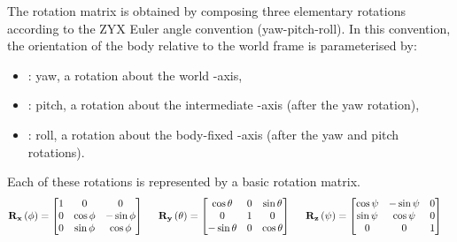 The rotation matrix  is obtained by composing three elementary rotations according to
the ZYX Euler angle convention (yaw-pitch-roll). In this convention, the orientation of the body
relative to the world frame is parameterised by:
\begin{itemize}
	\item \scal{\psi}: yaw, a rotation about the world -axis,
	\item \scal{\theta}: pitch, a rotation about the intermediate -axis (after the yaw rotation),
	\item \scal{\phi}: roll, a rotation about the body-fixed -axis (after the yaw and pitch rotations).
\end{itemize}

Each of these rotations is represented by a basic rotation matrix. \trigsh{}
\begin{align}
	\lrdmatr{R}{\vect{x}}\left(\scal{\phi}\right) & =
	\begin{bmatrix}
		1 & 0                 & 0                  \\
		0 & \cos{\scal{\phi}} & -\sin{\scal{\phi}} \\
		0 & \sin{\scal{\phi}} & \cos{\scal{\phi}}
	\end{bmatrix} \hspace{.5cm}
	\lrdmatr{R}{\vect{y}}\left(\scal{\theta}\right) =
	\begin{bmatrix}
		\cos{\scal{\theta}}  & 0 & \sin{\scal{\theta}} \\
		0                    & 1 & 0                   \\
		-\sin{\scal{\theta}} & 0 & \cos{\scal{\theta}}
	\end{bmatrix} \hspace{.5cm}
	\lrdmatr{R}{\vect{z}}\left(\scal{\psi}\right) =
	\begin{bmatrix}
		\cos{\scal{\psi}} & -\sin{\scal{\psi}} & 0 \\
		\sin{\scal{\psi}} & \cos{\scal{\psi}}  & 0 \\
		0                 & 0                  & 1
	\end{bmatrix}
\end{align}

